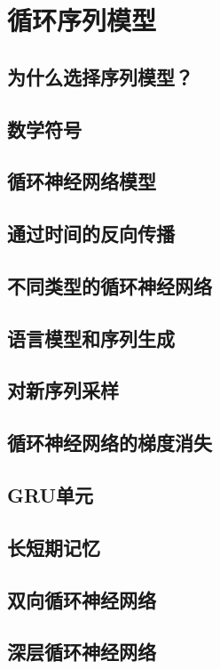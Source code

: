 \documentclass[../../main.tex]{subfiles}
\begin{document}
\chapter{循环序列模型}

\section{为什么选择序列模型？}

\section{数学符号}

\section{循环神经网络模型}

\section{通过时间的反向传播}

\section{不同类型的循环神经网络}

\section{语言模型和序列生成}

\section{对新序列采样}

\section{循环神经网络的梯度消失}

\section{GRU单元}

\section{长短期记忆}

\section{双向循环神经网络}

\section{深层循环神经网络}
\end{document}
